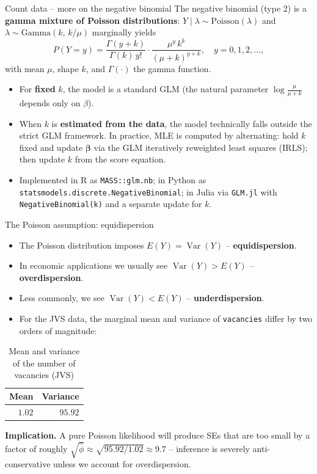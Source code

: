 \documentclass[10pt,ignorenonframetext,aspectratio=169]{beamer}
\begin{document}
\begin{frame}{Count data -- more on the negative binomial}
The negative binomial (type 2) is a \textbf{gamma mixture of Poisson distributions}: $Y \mid \lambda \sim \text{Poisson}(\lambda)$ and $\lambda \sim \text{Gamma}(k,\, k/\mu)$ marginally yields
\[
P(Y = y) = \frac{\Gamma(y + k)}{\Gamma(k)\, y!} \cdot \frac{\mu^{y}\, k^{k}}{(\mu + k)^{y + k}}, \quad y = 0, 1, 2, \ldots,
\]
with mean $\mu$, shape $k$, and $\Gamma(\cdot)$ the gamma function.

\begin{itemize}
\justifying
    \item For \textbf{fixed} $k$, the model is a standard GLM (the natural parameter $\log\frac{\mu}{\mu+k}$ depends only on $\beta$).
    \item When $k$ is \textbf{estimated from the data}, the model technically falls outside the strict GLM framework. In practice, MLE is computed by alternating: hold $k$ fixed and update $\boldsymbol{\beta}$ via the GLM iteratively reweighted least squares (IRLS); then update $k$ from the score equation.
    \item Implemented in R as \texttt{MASS::glm.nb}; in Python as \texttt{statsmodels.discrete.NegativeBinomial}; in Julia via \texttt{GLM.jl} with \texttt{NegativeBinomial(k)} and a separate update for $k$.
\end{itemize}
\end{frame}


\begin{frame}{The Poisson assumption: equidispersion}
    \begin{itemize}
    \justifying
    \item The Poisson distribution imposes $E(Y) = \operatorname{Var}(Y)$ -- \textbf{equidispersion}.
    \item In economic applications we usually see $\operatorname{Var}(Y) > E(Y)$ -- \textbf{overdispersion}.
    \item Less commonly, we see $\operatorname{Var}(Y) < E(Y)$ -- \textbf{underdispersion}.
    \item For the JVS data, the marginal mean and variance of \texttt{vacancies} differ by two orders of magnitude:
\end{itemize}

\begin{table}[ht]
\centering
\caption{Mean and variance of the number of vacancies (JVS)}
\begin{tabular}{rr}
  \hline
  Mean & Variance \\
  \hline
  $1.02$ & $95.92$ \\
  \hline
\end{tabular}
\end{table}

\smallskip
\textbf{Implication.} A pure Poisson likelihood will produce SEs that are too small by a factor of roughly $\sqrt{\hat{\phi}} \approx \sqrt{95.92 / 1.02} \approx 9.7$ -- inference is severely anti-conservative unless we account for overdispersion.
\end{frame}
\end{document}
